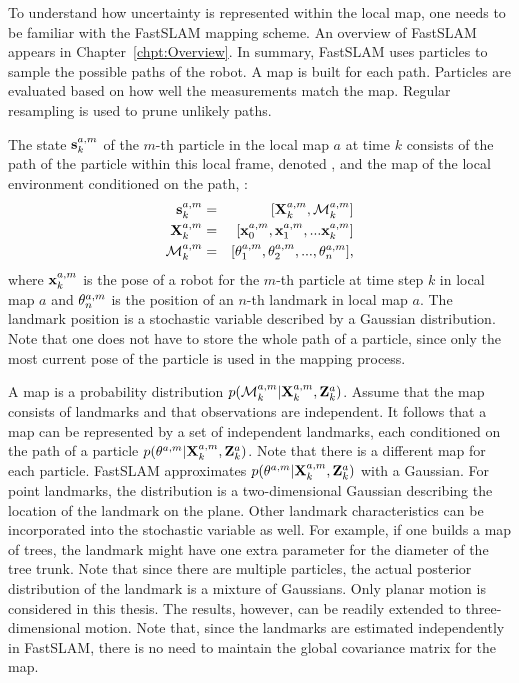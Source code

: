 To understand how uncertainty is represented within the local map, one
needs to be familiar with the FastSLAM \cite{Montemerlo2003} mapping
scheme.
An overview of FastSLAM appears in
Chapter~\ref{chpt:Overview}. In summary, FastSLAM uses particles to
sample the possible paths of the robot. A map is built for each
path. Particles are evaluated based on how well the measurements match
the map.  Regular resampling is used to prune unlikely paths.

The state $\s{k}{a}{m}$ of the $m$-th particle in the local map $a$
at time $k$ consists of the path of the particle within this local
frame, denoted , and the map of the local environment
conditioned on the path, :
\begin{eqnarray}
 \s{k}{a}{m}    &=& [\Xall{k}{a}{m}, \map{k}{a}{m} ] \nonumber \\ 
 \Xall{k}{a}{m} &=& [\x{0}{a}{m}, \x{1}{a}{m}, ... \x{k}{a}{m}] \nonumber \\ 
 \map{k}{a}{m}  &=& [\mape{a}{m}{1}, \mape{a}{m}{2}, ..., \mape{a}{m}{n}], \nonumber
\end{eqnarray}
where $\x{k}{a}{m}$ is the pose of a robot for the $m$-th particle at
time step $k$ in local map $a$ and $\mape{a}{m}{n}$ is the position of
an $n$-th landmark in local map $a$. The landmark position is a
stochastic variable described by a Gaussian distribution. Note that
one does not have to store the whole path of a particle, since only
the most current pose of the particle is used in the mapping process.

A map is a probability distribution
$p(\map{k}{a}{m}|\Xall{k}{a}{m},\Zall{k}{a})$. Assume that the map
consists of landmarks and that observations are independent. It
follows that a map can be represented by a set of independent
landmarks, each conditioned on the path of a particle
$p(\mape{a}{m}{}|\Xall{k}{a}{m},\Zall{k}{a})$. Note that there is a
different map for each particle. FastSLAM approximates
$p(\mape{a}{m}{}|\Xall{k}{a}{m},\Zall{k}{a})$ with a Gaussian.  For
point landmarks, the distribution is a two-dimensional Gaussian
describing the location of the landmark on the plane. Other landmark
characteristics can be incorporated into the stochastic variable as
well. For example, if one builds a map of trees, the landmark might
have one extra parameter for the diameter of the tree trunk.  Note
that since there are multiple particles, the actual posterior
distribution of the landmark is a mixture of Gaussians.  Only planar
motion is considered in this thesis. The results, however, can be
readily extended to three-dimensional motion. Note that, since the
landmarks are estimated independently in FastSLAM, there is no need to
maintain the global covariance matrix for the map.

